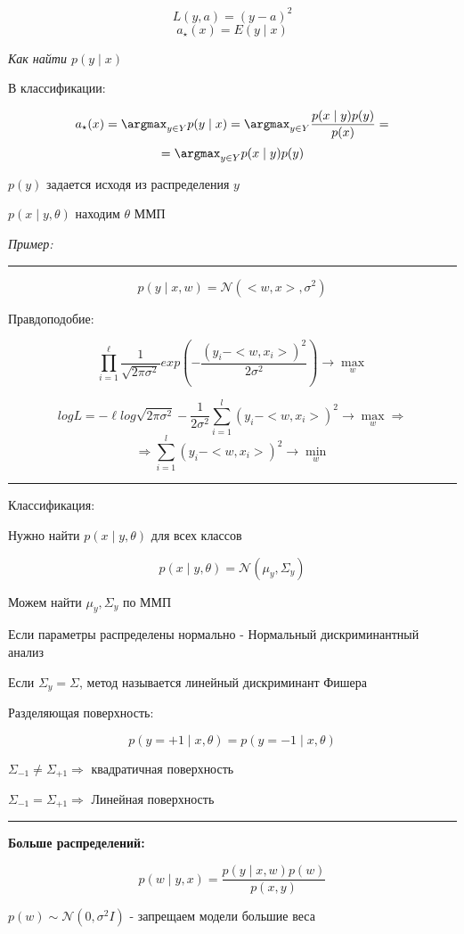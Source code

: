 \documentclass[a4paper, 12pt]{article}
\begin{document}
\[L(y, a) = (y - a)^2\]
\[a_{\star}(x) = E(y \mid x)\]

\textit{Как найти $p(y \mid x)$}

В классификации: 

\[a_{\star}(x) = 
\argmax_{y \in Y} p(y \mid x) = 
\argmax_{y \in Y} \frac{p(x \mid y)p(y)}{p(x)} = \]
\[= \argmax_{y \in Y}p(x \mid y)p(y)\]

$p(y)$ задается исходя из распределения $y$

$p(x \mid y, \theta)$ находим $\theta$ ММП
\newline

\textit{Пример:}

\rule{\linewidth}{0.5pt}
\[p(y \mid x, w) = \mathcal{N}(<w, x>, \sigma^{2})\]

Правдоподобие:

\[\prod_{i = 1}^{\ell}\frac{1}{\sqrt{2 \pi \sigma^{2}}}
exp(-\frac{(y_i - <w, x_i>)^{2}}{2\sigma^{2}}) 
\rightarrow \max_{w}\]

\[logL = -\ell log\sqrt{2 \pi \sigma^{2}} - 
\frac{1}{2 \sigma^{2}}\sum_{i = 1}^{l}(y_i - <w, x_i>)^2
\rightarrow \max_{w} \Rightarrow\]
\[\Rightarrow \sum_{i = 1}^{l}(y_i - <w, x_i>)^2 
\rightarrow \min_{w}\]
\rule{\linewidth}{0.5pt}
\newline

Классификация:

Нужно найти $p(x \mid y, \theta)$ для всех классов

\[p(x \mid y, \theta) = \mathcal{N}(\mu_{y}, \Sigma_{y})\]

Можем найти $\mu_y, \Sigma_y$ по ММП

Если параметры распределены нормально - 
Нормальный дискриминантный анализ

Если $\Sigma_y = \Sigma$, метод называется
линейный дискриминант Фишера

Разделяющая поверхность:

\[p(y = +1 \mid x, \theta) = p(y = -1 \mid x, \theta)\]

$\Sigma_{-1} \neq \Sigma_{+1} \Rightarrow$ квадратичная поверхность

$\Sigma_{-1} = \Sigma_{+1} \Rightarrow$ Линейная поверхность

\rule{\linewidth}{0.5pt}

\textbf{Больше распределений:}

\[p(w \mid y, x) = \frac{p(y \mid x, w)p(w)}{p(x, y)}\]

$p(w) \sim \mathcal{N}(0, \sigma^{2}I)$ - запрещаем модели большие веса
\end{document}
